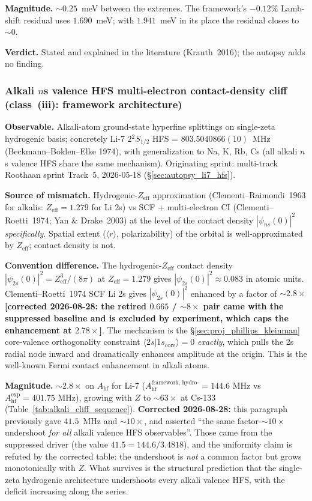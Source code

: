 \documentclass[11pt]{article}
\begin{document}
\textbf{Magnitude.}  $\sim 0.25$~meV between the extremes.  The
framework's $-0.12\%$ Lamb-shift residual uses $1.690$~meV; with
$1.941$~meV in its place the residual closes to $\sim 0$.

\textbf{Verdict.}  Stated and explained in the literature
(Krauth~2016); the autopsy adds no finding.

\subsubsection{Alkali $n$s valence HFS multi-electron contact-density
cliff (class~(iii): framework architecture)}
\label{sec:conv_alkali_hfs}

\textbf{Observable.}  Alkali-atom ground-state hyperfine splittings on
single-zeta hydrogenic basis; concretely Li-7 $2{}^2S_{1/2}$
HFS = $803.5040866(10)$~MHz (Beckmann--Boklen--Elke 1974), with
generalization to Na, K, Rb, Cs (all alkali $n$s valence HFS share
the same mechanism).  Originating sprint: multi-track Roothaan
sprint Track~5, 2026-05-18 (\S\ref{sec:autopsy_li7_hfs}).

\textbf{Source of mismatch.}  Hydrogenic-$Z_\text{eff}$ approximation
(Clementi--Raimondi~1963 for alkalis: $Z_\text{eff} = 1.279$ for
Li 2s) vs SCF + multi-electron CI (Clementi--Roetti~1974;
Yan \& Drake~2003) at the level of the contact density
$|\psi_{ns}(0)|^2$ \emph{specifically}.  Spatial extent
($\langle r \rangle$, polarizability) of the orbital is well-approximated
by $Z_\text{eff}$; contact density is not.

\textbf{Convention difference.}  The hydrogenic-$Z_\text{eff}$ contact
density $|\psi_{2s}(0)|^2 = Z_\text{eff}^3/(8\pi)$ at
$Z_\text{eff} = 1.279$ gives $|\psi_{2s}(0)|^2 \approx 0.083$
in atomic units.  Clementi--Roetti~1974 SCF Li 2s gives
$|\psi_{2s}(0)|^2$ enhanced by a factor of $\sim 2.8\times$
\textbf{[corrected 2026-08-28: the retired $0.665$ / $\sim 8\times$ pair
came with the suppressed baseline and is excluded by experiment, which
caps the enhancement at $2.78\times$]}.  The mechanism is the
\S\ref{sec:proj_phillips_kleinman} core-valence orthogonality
constraint $\langle 2s | 1s_\text{core}\rangle = 0$ \emph{exactly},
which pulls the 2s radial node inward and dramatically enhances
amplitude at the origin.  This is the well-known Fermi contact
enhancement in alkali atoms.

\textbf{Magnitude.}  $\sim 2.8\times$ on $A_\text{hf}$ for Li-7
($A_\text{hf}^\text{framework, hydro-} = 144.6$ MHz vs
$A_\text{hf}^\text{exp} = 401.75$ MHz), growing with $Z$ to
$\sim 63\times$ at Cs-133 (Table~\ref{tab:alkali_cliff_sequence}).
\textbf{Corrected 2026-08-28:} this paragraph previously gave
$41.5$~MHz and $\sim 10\times$, and asserted ``the same
factor-$\sim 10\times$ undershoot \emph{for all} alkali valence HFS
observables''.  Those came from the suppressed driver (the value
$41.5 = 144.6/3.4818$), and the uniformity claim is refuted by the
corrected table: the undershoot is \emph{not} a common factor but
grows monotonically with $Z$.  What survives is the structural
prediction that the single-zeta hydrogenic architecture undershoots
every alkali valence HFS, with the deficit increasing along the series.
\end{document}
